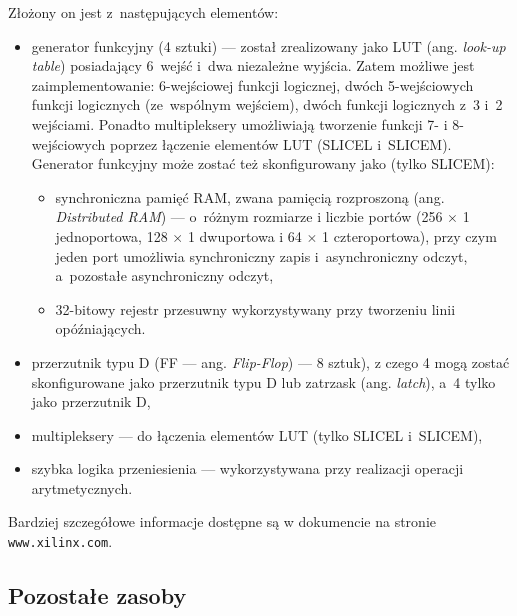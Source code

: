 Złożony on jest z~następujących elementów:
\begin{itemize}
\item generator funkcyjny (4 sztuki) --- został zrealizowany jako {LUT} (ang. \textit{look-up table}) posiadający 6~wejść i~dwa niezależne wyjścia. 
Zatem możliwe jest zaimplementowanie: 6-wejściowej funkcji logicznej, dwóch 5-wejściowych funkcji logicznych (ze~wspólnym wejściem), dwóch funkcji logicznych z~3 i~2 wejściami. 
Ponadto multipleksery umożliwiają tworzenie funkcji 7- i 8-wejściowych poprzez łączenie elementów LUT (SLICEL i~SLICEM). 
Generator funkcyjny może zostać też skonfigurowany jako (tylko SLICEM): 
\begin{itemize}
\item synchroniczna pamięć RAM, zwana pamięcią rozproszoną (ang. \textit{Distributed RAM})
 --- o~różnym rozmiarze i liczbie portów (256 $\times$ 1 jednoportowa, 128 $\times$ 1 dwuportowa i 64 $\times$ 1 czteroportowa), przy czym jeden port umożliwia synchroniczny zapis i~asynchroniczny odczyt, a~pozostałe asynchroniczny odczyt,
\item 32-bitowy rejestr przesuwny wykorzystywany przy tworzeniu linii opóźniających.
\end{itemize}
\item przerzutnik typu D ({FF} --- ang. \textit{Flip-Flop}) --- 8 sztuk), z czego 4 mogą zostać skonfigurowane jako przerzutnik typu D lub zatrzask (ang. \textit{latch}), a~4 tylko jako przerzutnik D,
\item multipleksery --- do łączenia elementów LUT (tylko SLICEL i~SLICEM),
\item szybka logika przeniesienia --- wykorzystywana przy realizacji operacji arytmetycznych.

\end{itemize}

Bardziej szczegółowe informacje dostępne są w dokumencie \cite{xilix_sp6ugCLB} na stronie \texttt{www.xilinx.com}.


\subsection{Pozostałe zasoby}
  

